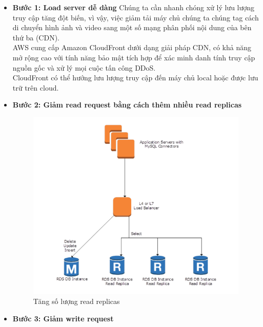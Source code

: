 \begin{itemize}
    \item \textbf{Bước 1: Load server dễ dàng}
        \newline
        Chúng ta cần nhanh chóng xử lý lưu lượng truy cập tăng đột biến, vì vậy, việc giảm tải máy chủ chúng ta chúng tag cách di chuyển hình ảnh và video sang một số mạng phân phối nội dung của bên thứ ba (CDN). \\[0.5cm]
        AWS cung cấp Amazon CloudFront dưới dạng giải pháp CDN, có khả năng mở rộng cao với tính năng bảo mật tích hợp để xác minh danh tính truy cập nguồn gốc và xử lý mọi cuộc tấn công DDoS. \\[0.5cm]
        CloudFront có thể hướng lưu lượng truy cập đến máy chủ local hoặc được lưu trữ trên cloud.
    \item \textbf{Bước 2: Giảm read request bằng cách thêm nhiều read replicas}
        \begin{figure}[H]
            \begin{center}
            \includegraphics[scale=1]{images/hieu/chap-2/read-replica.png}
            \vspace*{5mm}
            \caption{Tăng số lượng read replicas}
            \end{center}
        \end{figure} 
    \item \textbf{Bước 3: Giảm write request}
        \begin{figure}[H]
            \begin{center}

\end{center}
\end{figure}
\end{itemize}
